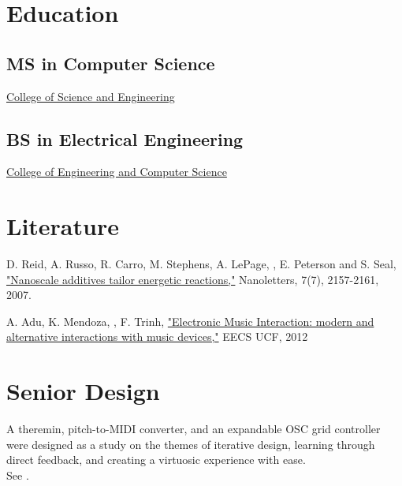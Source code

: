 \documentclass[]{resume-openfont} %
\begin{document}
\lastupdated
{}

\begin{minipage}[t]{0.34\textwidth}
\section{Education}
\subsection{MS in Computer Science}
\href{http://cs.sfsu.edu}{College of Science and Engineering}
\sectionsep

\subsection{BS in Electrical Engineering}
\href{http://www.ece.ucf.edu}{College of Engineering and Computer Science}

\section{Literature}
\textbullet{} D. Reid, A. Russo, R. Carro, M. Stephens, A. LePage, , E. Peterson and S. Seal, \href{http://pubs.acs.org/doi/abs/10.1021/nl0625372}{"Nanoscale additives tailor energetic reactions,"} Nanoletters, 7(7), 2157-2161, 2007.

\textbullet{} A. Adu, K. Mendoza, , F. Trinh, \href{http://eecs.ucf.edu/seniordesign/su2012fa2012/g01/docs/seniordesign2paper.pdf}{"Electronic Music Interaction: modern and alternative interactions with music  devices,"} EECS UCF, 2012

\section{Senior Design}
A theremin, pitch-to-MIDI converter, and an expandable OSC grid controller were designed as a study on the themes of iterative design, learning through direct feedback, and creating a virtuosic experience with ease. \\
See \href{http://eecs.ucf.edu/seniordesign/su2012fa2012/g01}{}.%


\end{minipage}
\end{document}
